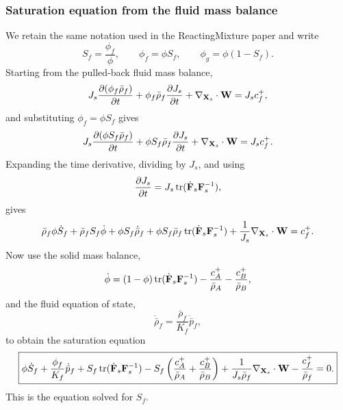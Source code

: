 \documentclass[11pt]{article}
\begin{document}
\subsubsection{Saturation equation from the fluid mass balance}
We retain the same notation used in the ReactingMixture paper and write
\begin{equation}
  S_f = \frac{\phi_f}{\phi},
  \qquad
  \phi_f = \phi S_f,
  \qquad
  \phi_g = \phi(1-S_f).
  \label{eq:Sf_definition_mass}
\end{equation}
Starting from the pulled-back fluid mass balance,
\begin{equation}
  J_s\frac{\partial(\phi_f\bar\rho_f)}{\partial t} + \phi_f\bar\rho_f\frac{\partial J_s}{\partial t} + \nabla_{\mathbf{X}_s}\cdot\mathbf{W} = J_s c_f^+,
  \label{eq:sat_fluid_start}
\end{equation}
and substituting $\phi_f = \phi S_f$ gives
\begin{equation}
  J_s\frac{\partial(\phi S_f \bar\rho_f)}{\partial t} + \phi S_f \bar\rho_f\frac{\partial J_s}{\partial t} + \nabla_{\mathbf{X}_s}\cdot\mathbf{W} = J_s c_f^+.
  \label{eq:sat_fluid_sub_1}
\end{equation}
Expanding the time derivative, dividing by $J_s$, and using
\begin{equation}
  \frac{\partial J_s}{\partial t} = J_s\,\mbox{tr}(\dot{\mathbf{F}}_s\mathbf{F}_s^{-1}),
  \label{eq:Js_rate_sat}
\end{equation}
gives
\begin{equation}
  \bar\rho_f\phi\dot S_f + \bar\rho_f S_f\dot\phi + \phi S_f\dot{\bar\rho}_f + \phi S_f\bar\rho_f\,\mbox{tr}(\dot{\mathbf{F}}_s\mathbf{F}_s^{-1}) + \frac{1}{J_s}\nabla_{\mathbf{X}_s}\cdot\mathbf{W} = c_f^+.
  \label{eq:sat_fluid_sub_3}
\end{equation}
Now use the solid mass balance,
\begin{equation}
  \dot\phi = (1-\phi)\,\mbox{tr}(\dot{\mathbf{F}}_s\mathbf{F}_s^{-1}) - \frac{c_A^+}{\bar\rho_A} - \frac{c_B^+}{\bar\rho_B},
  \label{eq:sat_solid_sub_2}
\end{equation}
and the fluid equation of state,
\begin{equation}
  \dot{\bar\rho}_f = \frac{\bar\rho_f}{K_f}\dot{\bar p}_f,
  \label{eq:sat_fluid_eos_sub}
\end{equation}
to obtain the saturation equation
\begin{equation}
  \boxed{\phi\dot S_f + \frac{\phi_f}{K_f}\dot{\bar p}_f + S_f\,\mbox{tr}(\dot{\mathbf{F}}_s\mathbf{F}_s^{-1}) - S_f\left(\frac{c_A^+}{\bar\rho_A} + \frac{c_B^+}{\bar\rho_B}\right) + \frac{1}{J_s\bar\rho_f}\nabla_{\mathbf{X}_s}\cdot\mathbf{W} - \frac{c_f^+}{\bar\rho_f} = 0.}
  \label{eq:sat_from_fluid_eos}
\end{equation}
This is the equation solved for $S_f$.
\end{document}
